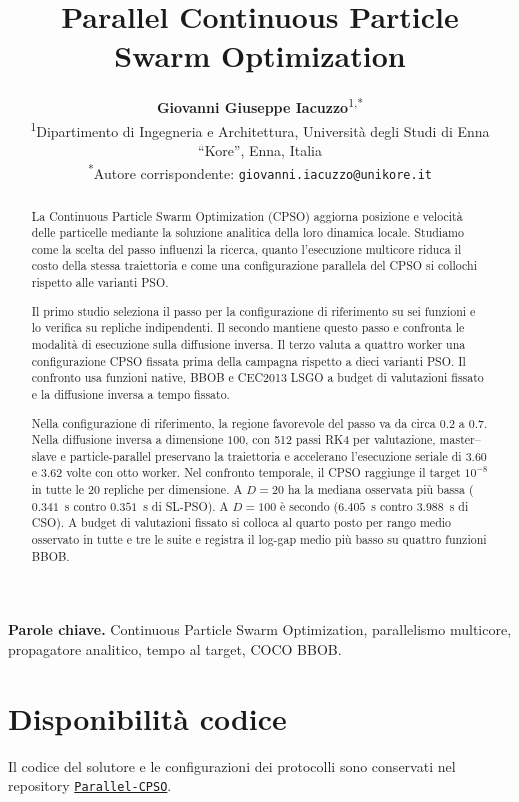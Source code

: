 \documentclass[10pt,a4paper,twocolumn]{article}
\title{Parallel Continuous Particle Swarm Optimization}
\author{
  \textbf{Giovanni Giuseppe Iacuzzo}\textsuperscript{1,*} \\
  \small \textsuperscript{1}Dipartimento di Ingegneria e Architettura, Universit\`a degli Studi di Enna ``Kore'', Enna, Italia \\
  \small \textsuperscript{*}Autore corrispondente: \texttt{giovanni.iacuzzo@unikore.it}
}
\date{}
\begin{document}
\maketitle
\begin{abstract}
La Continuous Particle Swarm Optimization (CPSO) aggiorna posizione e velocità delle particelle mediante la soluzione analitica della loro dinamica locale. Studiamo come la scelta del passo influenzi la ricerca, quanto l'esecuzione multicore riduca il costo della stessa traiettoria e come una configurazione parallela del CPSO si collochi rispetto alle varianti PSO.

Il primo studio seleziona il passo per la configurazione di riferimento su sei funzioni e lo verifica su repliche indipendenti. Il secondo mantiene questo passo e confronta le modalità di esecuzione sulla diffusione inversa. Il terzo valuta a quattro worker una configurazione CPSO fissata prima della campagna rispetto a dieci varianti PSO. Il confronto usa funzioni native, BBOB e CEC2013 LSGO a budget di valutazioni fissato e la diffusione inversa a tempo fissato.

Nella configurazione di riferimento, la regione favorevole del passo va da circa $0.2$ a $0.7$. Nella diffusione inversa a dimensione $100$, con 512 passi RK4 per valutazione, master--slave e particle-parallel preservano la traiettoria e accelerano l'esecuzione seriale di $3.60$ e $3.62$ volte con otto worker. Nel confronto temporale, il CPSO raggiunge il target $10^{-8}$ in tutte le 20 repliche per dimensione. A $D=20$ ha la mediana osservata più bassa ($0.341$~s contro $0.351$~s di SL-PSO). A $D=100$ è secondo ($6.405$~s contro $3.988$~s di CSO). A budget di valutazioni fissato si colloca al quarto posto per rango medio osservato in tutte e tre le suite e registra il log-gap medio più basso su quattro funzioni BBOB.
\end{abstract}
\par\smallskip
\noindent\textbf{Parole chiave.} Continuous Particle Swarm Optimization, parallelismo multicore, propagatore analitico, tempo al target, COCO BBOB.






\FloatBarrier


\FloatBarrier

\section*{Disponibilità codice}
Il codice del solutore e le configurazioni dei protocolli sono conservati nel repository \href{https://github.com/GiovanniIacuzzo/Parallel-Continuous-Particle-Swarm-Optimization}{\texttt{Parallel-CPSO}}.


\renewcommand{\bibfont}{\small}
\setlength{\bibsep}{1pt}


\clearpage\onecolumn\appendix
{}
\setlength{\parskip}{0pt}

\clearpage \FloatBarrier

\FloatBarrier
\end{document}
